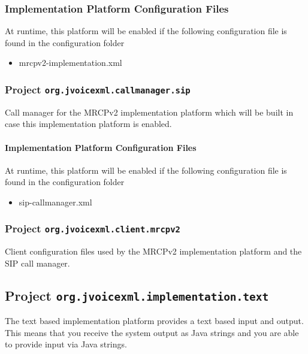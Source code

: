 \documentclass[11pt,a4paper]{article}
\begin{document}
\subsubsection{Implementation Platform Configuration Files}

At runtime, this platform will be enabled if the following configuration file is found in the configuration
folder
\begin{itemize}
\item mrcpv2-implementation.xml
\end{itemize}

\subsubsection{Project \texttt{org.jvoicexml.callmanager.sip}}

Call manager for the MRCPv2 implementation platform which will be built in case this implementation platform is enabled.

\paragraph{Implementation Platform Configuration Files}

At runtime, this platform will be enabled if the following configuration file is found in the configuration
folder
\begin{itemize}
\item sip-callmanager.xml
\end{itemize}
 
\subsubsection{Project \texttt{org.jvoicexml.client.mrcpv2}}

Client configuration files used by the MRCPv2 implementation platform and the SIP call manager.

\subsection{Project \texttt{org.jvoicexml.implementation.text}}
\label{sec:text-implemenation-platform}

The text based implementation platform provides a text based input and output.
This means that you receive the system output as Java strings and you are able
to provide input via Java strings.
\end{document}
